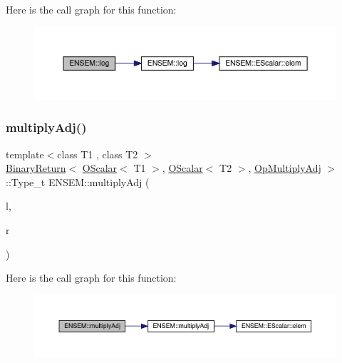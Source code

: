 Here is the call graph for this function\+:\nopagebreak
\begin{figure}[H]
\begin{center}
\leavevmode
\includegraphics[width=350pt]{d1/d71/group__obsscalar_gac3f245df6eb6b0c94e6aa959b1e7676c_cgraph}
\end{center}
\end{figure}
\mbox{\label{group__obsscalar_ga0549c309e400fa9b2c660bdec29e7f91}} 
\subsubsection{\texorpdfstring{multiplyAdj()}{multiplyAdj()}}
{\footnotesize\ttfamily template$<$class T1 , class T2 $>$ \\
\mbox{\hyperlink{structENSEM_1_1BinaryReturn}{Binary\+Return}}$<$ \mbox{\hyperlink{classENSEM_1_1OScalar}{O\+Scalar}}$<$ T1 $>$, \mbox{\hyperlink{classENSEM_1_1OScalar}{O\+Scalar}}$<$ T2 $>$, \mbox{\hyperlink{structENSEM_1_1OpMultiplyAdj}{Op\+Multiply\+Adj}} $>$\+::Type\+\_\+t E\+N\+S\+E\+M\+::multiply\+Adj (\begin{DoxyParamCaption}\item[{const \mbox{\hyperlink{classENSEM_1_1OScalar}{O\+Scalar}}$<$ T1 $>$ \&}]{l,  }\item[{const \mbox{\hyperlink{classENSEM_1_1OScalar}{O\+Scalar}}$<$ T2 $>$ \&}]{r }\end{DoxyParamCaption})\hspace{0.3cm}{\ttfamily [inline]}}

Here is the call graph for this function\+:\nopagebreak
\begin{figure}[H]
\begin{center}
\leavevmode
\includegraphics[width=350pt]{d1/d71/group__obsscalar_ga0549c309e400fa9b2c660bdec29e7f91_cgraph}
\end{center}
\end{figure}
\mbox{\label{group__obsscalar_ga0ce8b28e6efb00e905152096020cfafe}} 
